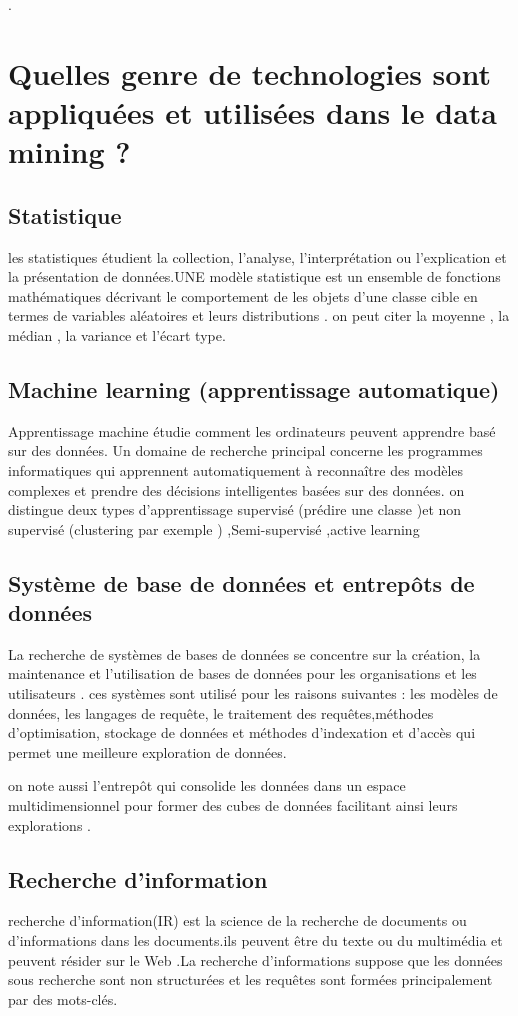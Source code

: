 \documentclass[12pt,a4paper,oneside]{book}
\begin{document}
.
\section{Quelles genre de technologies sont appliquées et utilisées dans le data mining ?}
\subsection{Statistique}
les statistiques étudient la collection, l'analyse, l'interprétation ou l'explication et la présentation de données.UNE modèle statistique est un ensemble de fonctions mathématiques décrivant le comportement de les objets d'une classe cible en termes de variables aléatoires et leurs distributions . on peut citer la moyenne , la médian , la variance et l'écart type.

\subsection{Machine learning (apprentissage automatique)}
Apprentissage machine étudie comment les ordinateurs peuvent apprendre basé sur des données.
Un domaine de recherche principal concerne les programmes informatiques qui apprennent automatiquement  à reconnaître des modèles complexes et prendre des décisions intelligentes basées sur des données. 
on distingue deux types d'apprentissage supervisé (prédire une classe )et non supervisé (clustering par exemple ) ,Semi-supervisé ,active learning 
\subsection{Système de base de données et entrepôts de données}
La recherche de systèmes de bases de données se concentre sur la création, la maintenance et l'utilisation de bases de données pour les organisations et les utilisateurs .
ces systèmes sont utilisé pour les raisons suivantes :
les modèles de données, les langages de requête, le traitement des requêtes,méthodes d’optimisation, stockage de données et méthodes d’indexation et d’accès qui permet une meilleure exploration de données.

on note aussi  l'entrepôt qui consolide
les données dans un espace multidimensionnel pour former des cubes de données facilitant ainsi leurs explorations .

\subsection{Recherche d'information}
recherche d'information(IR) est la science de la recherche de documents ou d'informations dans les documents.ils peuvent être du texte ou du multimédia et peuvent résider sur le Web .La recherche d'informations suppose que  les données sous recherche sont non structurées et les requêtes sont formées principalement par des mots-clés.
\end{document}
